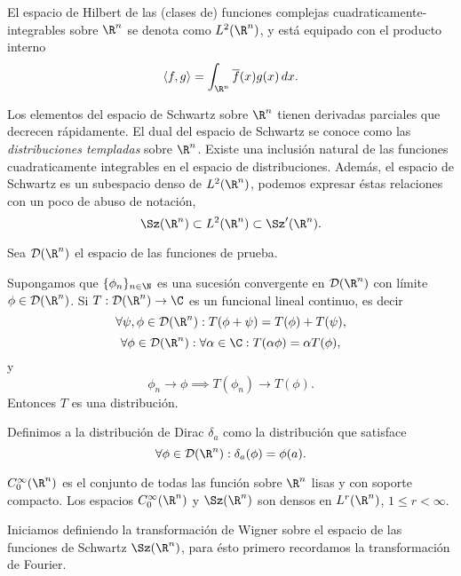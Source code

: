   \begin{definition}
    El espacio de Hilbert de las (clases de) funciones
    complejas cuadraticamente-integrables sobre $\R^{n}$ se
    denota como $L^2(\R^{n})$, y está equipado con el
    producto interno
    \[
      \langle f, g \rangle
      = \int_{\R^{n}} \overline{f}(x) g(x) \, dx.
    \] 
  \end{definition}
 
  Los elementos del espacio de Schwartz sobre $\R^{n}$
  tienen derivadas parciales que decrecen rápidamente. El
  dual del espacio de Schwartz se conoce como las
  \textit{distribuciones templadas} sobre $\R^{n}$. Existe
  una inclusión natural de las funciones cuadraticamente
  integrables en el espacio de distribuciones. Además, el
  espacio de Schwartz es un subespacio denso de
  $L^2(\R^{n})$, podemos expresar éstas relaciones con un
  poco de abuso de notación,
  \[
    \Sz(\R^{n})
    \subset L^2(\R^{n})
    \subset \Sz'(\R^{n}).
  \]

  Sea $\mathcal D(\R^{n})$ el espacio de las funciones de
  prueba.

  \begin{definition}
    Supongamos que $\{\phi_n\}_{n \in \N}$ es una sucesión
    convergente en $\mathcal D(\R^{n})$ con límite $\phi \in
    \mathcal D(\R^{n})$. Si $T : \mathcal D(\R^{n}) \to \C$
    es un funcional lineal continuo, es decir
    \[
      \forall \psi, \phi \in \mathcal D(\R^{n}) : T(\phi +
      \psi) = T(\phi) + T(\psi),
    \] 
    \[
      \forall \phi \in \mathcal D(\R^{n}) : \forall \alpha
      \in \C : T(\alpha \phi) = \alpha T(\phi),
    \] 
    y
    \[
      \phi_n \to \phi \implies T(\phi_n) \to T(\phi).
    \] 
    Entonces $T$ es una distribución.
  \end{definition}

  \begin{definition}
    Definimos a la distribución de Dirac $\delta_a$ como la
    distribución que satisface
    \[
      \forall \phi \in \mathcal D(\R^{n}) : \delta_a(\phi) =
      \phi(a).
    \] 
  \end{definition}

  $C^{\infty}_0(\R^{n})$ es el conjunto de todas las función
  sobre $\R^{n}$ lisas y con soporte compacto. Los espacios
  $C^{\infty}_0(\R^{n})$ y $\Sz(\R^{n})$ son densos en
  $L^{r}(\R^{n})$, $1 \leq r < \infty$.

  Iniciamos definiendo
  la transformación de Wigner sobre el espacio de las
  funciones de Schwartz $\Sz(\R^{n})$, para ésto primero
  recordamos la transformación de Fourier.

